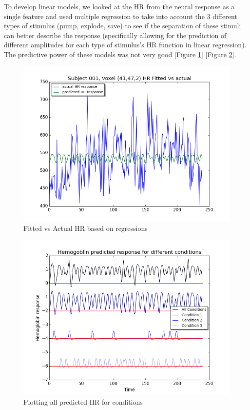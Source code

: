 \par To develop linear models, we looked at the HR from the neural response as a single feature and used multiple regression to take into account the 3 different types of stimulus (pump, explode, save) to see if the separation of these stimuli can better describe the response (specifically allowing for the prediction of different amplitudes for each type of stimulus's HR function in linear regression). The predictive power of these models was not very good [Figure \ref{fig:fit_vs_act}] [Figure \ref{fig:all_cond_time}]. 

\begin{figure}[ht]
\centering
\includegraphics[scale=.5]{images/fitted_vs_actual_mult_regression}
\caption{Fitted vs Actual HR based on regressions}
\label{fig:fit_vs_act}
\end{figure}

  
\begin{figure}[ht]
\centering
\includegraphics[scale=.5]{images/all_cond_time}  
\caption{Plotting all predicted HR for conditions}
\label{fig:all_cond_time}
\end{figure}

